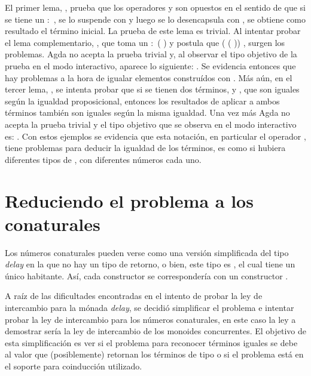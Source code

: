 El primer lema, \AgdaFunction{$\equiv\sharp\flat$}, prueba que los operadores \AgdaField{$\flat$} y \AgdaCoinductiveConstructor{$\sharp$} son opuestos en el sentido de que si se tiene un  $:$  \AgdaDatatype{$\bot$}, se lo suspende con \AgdaCoinductiveConstructor{$\sharp$} y luego se lo desencapsula con \AgdaField{$\flat$}, se obtiene como resultado el término inicial. La prueba de este lema es trivial. Al intentar probar el lema complementario, \AgdaFunction{$\equiv\flat\sharp$}, que toma un  $:$ \AgdaFunction{$\infty$} ( \AgdaDatatype{$\bot$}) y postula que (\AgdaCoinductiveConstructor{$\sharp$} (\AgdaField{$\flat$} )) \AgdaFunction{$\equiv$} , surgen los problemas. Agda no acepta la prueba trivial y, al observar el tipo objetivo de la prueba en el modo interactivo, aparece lo siguiente: . Se evidencia entonces que hay problemas a la hora de igualar elementos construídos con \AgdaCoinductiveConstructor{$\sharp$}. Más aún, en el tercer lema, \AgdaFunction{$\equiv\Rightarrow\sharp\equiv$}, se intenta probar que si se tienen dos términos,  y , que son iguales según la igualdad proposicional, entonces los resultados de aplicar \AgdaCoinductiveConstructor{$\sharp$} a ambos términos también son iguales según la misma igualdad. Una vez más Agda no acepta la prueba trivial y el tipo objetivo que se observa en el modo interactivo es: . Con estos ejemplos se evidencia que esta notación, en particular el operador \AgdaCoinductiveConstructor{$\sharp$}, tiene problemas para deducir la igualdad de los términos, es como si hubiera diferentes tipos de \AgdaCoinductiveConstructor{$\sharp$}, con diferentes números cada uno. 

\section{Reduciendo el problema a los conaturales}\label{casodelay:conat}

Los números conaturales pueden verse como una versión simplificada del tipo \textit{delay} en la que no hay un tipo de retorno, o bien, este tipo es \AgdaDatatype{$\top$}, el cual tiene un único habitante. Así, cada constructor  se correspondería con un constructor . 

A raíz de las dificultades encontradas en el intento de probar la ley de intercambio para la mónada \textit{delay}, se decidió simplificar el problema e intentar probar la ley de intercambio para los números conaturales, en este caso la ley a demostrar sería la ley de intercambio de los monoides concurrentes. El objetivo de esta simplificación es ver si el problema para reconocer términos iguales se debe al valor que (posiblemente) retornan los términos de tipo  \AgdaDatatype{$\bot$} o si el problema está en el soporte para coinducción utilizado.

